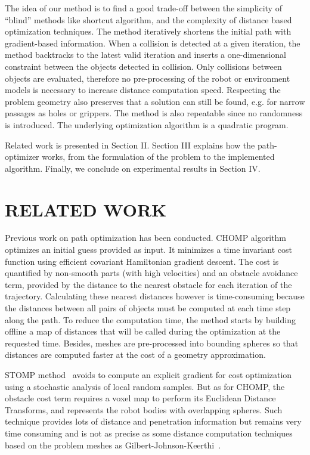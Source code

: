 \documentclass{tADR2e}
\begin{document}
The idea of our method is to find a good trade-off between
the simplicity of “blind” methods like shortcut algorithm,
and the complexity of distance based optimization techniques.
The method iteratively shortens the initial path with gradient-based information.
When a collision is detected at a given iteration, the method backtracks to the
latest valid iteration and inserts a one-dimensional constraint
between the objects detected in collision. Only collisions between objects are 
evaluated, therefore no pre-processing of the
robot or environment models is necessary to increase distance computation speed. 
Respecting the problem geometry also 
preserves that a solution can still be found, e.g. for narrow passages as holes or 
grippers. The method is also repeatable since no randomness is introduced. The underlying optimization algorithm is a quadratic program.

Related work is presented in Section II. Section III explains how the 
path-optimizer works, from the formulation of the problem to the implemented
algorithm. Finally, we conclude on experimental results in Section IV.

\section{RELATED WORK}
Previous work on path optimization has been conducted. CHOMP algorithm~\cite{chompIjrr} optimizes an initial guess provided as
input. It minimizes a time invariant cost function using efficient covariant
Hamiltonian gradient descent. The cost is quantified by non-smooth parts (with
high velocities) and an obstacle avoidance term, provided by the distance to the 
nearest obstacle for each iteration of the trajectory. Calculating these nearest 
distances however is time-consuming because the distances between all pairs of 
objects must be computed at each time step along the path. To reduce the 
computation time, the method starts by building offline a map of distances that 
will be called during the optimization at the requested time. Besides, meshes 
are pre-processed into bounding spheres so that distances are computed faster 
at the cost of a geometry approximation.

STOMP method~\cite{KalakrishnanStomp} avoids to compute an 
explicit gradient for cost optimization using a stochastic analysis of local 
random samples. But as for CHOMP, the obstacle cost term requires a voxel map to 
perform its Euclidean Distance Transforms, and represents the robot bodies with 
overlapping spheres. Such technique provides lots of distance and penetration 
information but remains very time consuming and is not as precise as some 
distance computation techniques based on the problem meshes as 
Gilbert-Johnson-Keerthi~\cite{gilbertGjk}.
\end{document}
